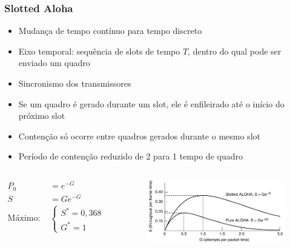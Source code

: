 \begin{frame}
	\frametitle{Slotted Aloha}
	
	\begin{itemize}
		\item Mudança de tempo contínuo para tempo discreto
		\item Eixo temporal: sequência de slots de tempo $T$, dentro do qual pode ser enviado um quadro
		\item Sincronismo dos transmissores
		\item Se um quadro é gerado durante um slot, ele é enfileirado até o início do próximo slot
		\item Contenção só ocorre entre quadros gerados durante o mesmo slot
		\item Período de contenção reduzido de 2 para 1 tempo de quadro
	\end{itemize}
	
	\begin{columns}
		\begin{small}
		\begin{align*}
		    P_0 &= e^{-G} \\
		    S &= Ge^{-G} \\
		    \text{Máximo: }& \begin{cases} S^* = 0,368 \\ G^* = 1 \end{cases}
		\end{align*}
		\end{small}		
		\vspace{-0.3cm}
		\begin{figure}[t]
			\begin{center}
				\includegraphics[width=\columnwidth]{figs/fig04-03}
			\end{center}
		\end{figure}
	\end{columns}
\end{frame}

